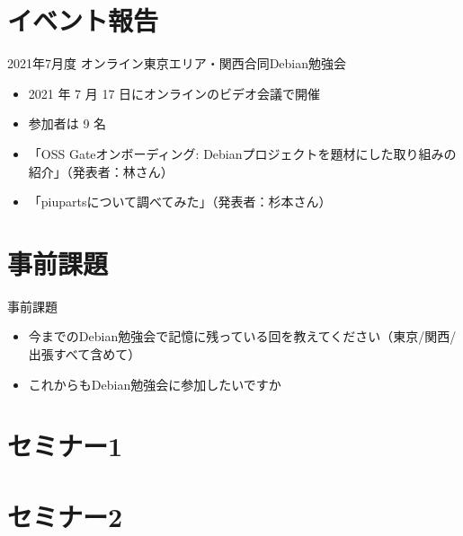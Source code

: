 \section{イベント報告}

\begin{frame}{2021年7月度 オンライン東京エリア・関西合同Debian勉強会}
\begin{itemize}
\item 2021 年 7 月 17 日にオンラインのビデオ会議で開催
\item 参加者は 9 名
\item 「OSS Gateオンボーディング: Debianプロジェクトを題材にした取り組みの紹介」（発表者：林さん）
\item 「piupartsについて調べてみた」（発表者：杉本さん）
\end{itemize}
\end{frame}


\section{事前課題}


\begin{frame}{事前課題}
  \begin{itemize}
  \item 今までのDebian勉強会で記憶に残っている回を教えてください（東京/関西/出張すべて含めて）
  \item これからもDebian勉強会に参加したいですか
  \end{itemize}
\end{frame}

{\footnotesize
  
}

%

\section{セミナー1}

\section{セミナー2}

